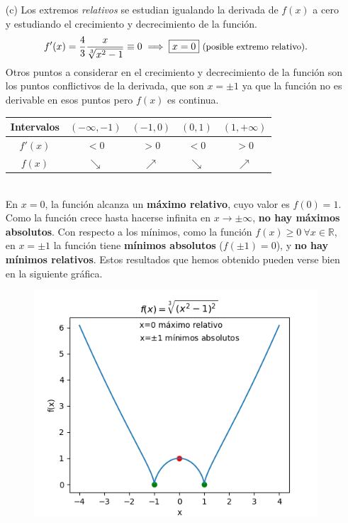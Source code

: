 \begin{enumerate}
    \item[(c)] Los extremos \emph{relativos} se estudian igualando la derivada de $f(x)$ a cero y estudiando el crecimiento y decrecimiento de la función.
    \begin{gather*}
        f'(x)=\frac{4}{3}\frac{x}{\sqrt[3]{x^2-1}}\equiv 0\implies \boxed{x=0} \text{ \small  (posible extremo relativo)}.
    \end{gather*}
    Otros puntos a considerar en el crecimiento y decrecimiento de la función son los puntos conflictivos de la derivada, que son $x=\pm 1$ ya que la función no es derivable en esos puntos pero $f(x)$ es continua.
    \begin{table}[!h]
        \centering
        \begin{tabular}{c|c|c|c|c}
           Intervalos  &$(-\infty ,-1)$ & $(-1,0)$     & $(0,1)$     & $(1,+\infty )$  \\ \hline
           $f'(x)$     & $<0$           & $>0$        & $<0$        & $>0$  \\ \hline 
           $f(x)$      &$\searrow $     & $\nearrow $ & $\searrow $ & $\nearrow $ \\
        \end{tabular}
        \label{tab:my_label2}
    \end{table}\\
    En $x=0$, la función alcanza un \textbf{máximo relativo}, cuyo valor es $f(0)=1$. Como la función crece hasta hacerse infinita en $x\to \pm \infty $, \textbf{no hay máximos absolutos}. Con respecto a los mínimos, como la función $f(x) \ge 0 \ \forall x \in \mathbb{R}$, en $x=\pm 1$ la función tiene \textbf{mínimos absolutos} ($f(\pm 1)=0$), y \textbf{no hay mínimos relativos}. 
    \newpage
    Estos resultados que hemos obtenido pueden verse bien en la siguiente gráfica.
    \begin{figure}[!h]
        \centering
        \includegraphics[scale=.7]{evau_2023.png}

\end{figure}
\end{enumerate}
